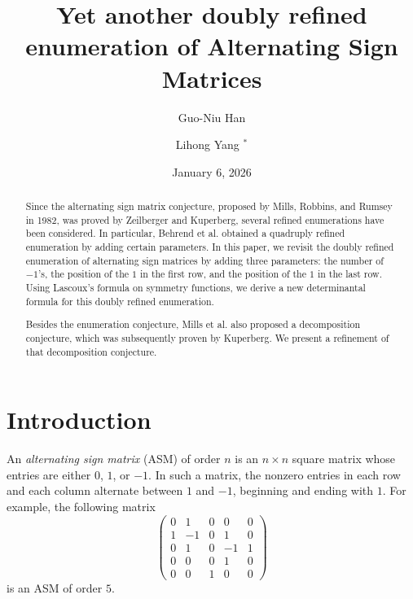 \documentclass[12pt, a4paper]{amsart} %
\title[Doubly refined enumeration of Alternating Sign Matrices]{Yet another doubly refined enumeration of Alternating Sign Matrices}
\author{Guo-Niu Han}
\author[Lihong Yang]{Lihong Yang $^*$}
\date{January 6, 2026}
\numberwithin{equation}{section}
\begin{document}
\begin{abstract} %
Since the alternating sign matrix conjecture, proposed by Mills, Robbins, and Rumsey in 1982, was proved by Zeilberger and Kuperberg, several refined enumerations have been considered.  
In particular, Behrend et al. obtained a quadruply refined enumeration by adding certain parameters.
In this paper, we revisit the doubly refined enumeration of alternating sign matrices
by adding three parameters: the number of $-1$'s, the position of the $1$ in the first row, 
and the position of the $1$ in the last row. 
Using Lascoux's formula on symmetry functions, we derive a new determinantal formula for this doubly refined enumeration. 

Besides the enumeration conjecture,  Mills et al. also proposed a decomposition conjecture, which was subsequently proven by Kuperberg.
We present a refinement of that decomposition conjecture.

\end{abstract}


\maketitle

\section{Introduction}  %

An {\em alternating sign matrix} (ASM) of order $n$ is an $n \times n$ square matrix whose entries are either $0$, $1$, or $-1$. In such a matrix, the nonzero entries in each row and each column alternate between $1$ and $-1$, beginning and ending with $1$. For example, the following matrix
\begin{equation}\label{m:asm1}
\left(
\begin{array}{ccccc}
0 & 1 & 0 & 0 & 0 \\
1 & -1 & 0 & 1 & 0 \\
0 & 1 & 0 & -1 & 1 \\
0 & 0 & 0 & 1 & 0 \\
0 & 0 & 1 & 0 & 0
\end{array}
\right)
\end{equation}
is an ASM of order $5$.
\end{document}
